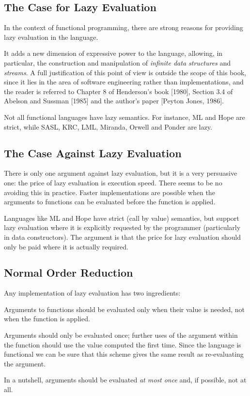 \subsection{The Case for Lazy Evaluation}

In the context of functional programming, there are strong reasons for
providing lazy evaluation in the language.

It adds a new dimension of expressive power to the language, allowing, in
particular, the construction and manipulation of \textit{infinite data structures} and
\textit{streams}. A full justification of this point of view is outside the scope of this book, since it lies in the area of software engineering rather than implementations, and the reader is referred to Chapter 8 of Henderson's book [1980], Section 3.4 of Abelson and Sussman [1985] and the author's paper [Peyton Jones, 1986].

Not all functional languages have lazy semantics. For instance, ML and
Hope are strict, while SASL, KRC, LML, Miranda, Orwell and Ponder are
lazy.

\subsection{The Case Against Lazy Evaluation}

There is only one argument against lazy evaluation, but it is a very persuasive
one: the price of lazy evaluation is execution speed. There seems to be no
avoiding this in practice. Faster implementations are possible when the
arguments to functions can be evaluated before the function is applied.

Languages like ML and Hope have strict (call by value) semantics, but
support lazy evaluation where it is explicitly requested by the programmer
(particularly in data constructors). The argument is that the price for lazy
evaluation should only be paid where it is actually required.

\subsection{Normal Order Reduction}

Any implementation of lazy evaluation has two ingredients:
\begin{numbered}
\item Arguments to functions should be evaluated only when their value is
needed, not when the function is applied.
\item Arguments should only be evaluated once; further uses of the argument
within the function should use the value computed the first time. Since the
language is functional we can be sure that this scheme gives the same
result as re-evaluating the argument.
\end{numbered}
In a nutshell, arguments should be evaluated \textit{at most once} and, if possible, not
at all.

